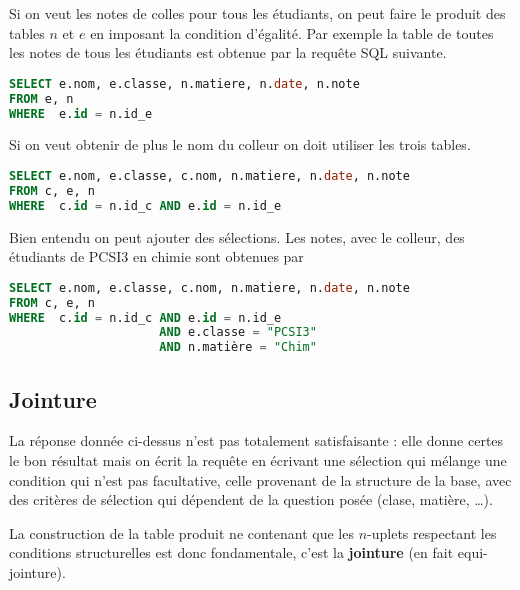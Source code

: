 Si on veut les notes de colles pour tous les étudiants, on peut faire le produit des tables $n$ et $e$ en imposant la condition d'égalité. Par exemple la table de toutes les notes de tous les étudiants est obtenue par la requête SQL suivante.
\begin{lstlisting}[language=SQL]
SELECT e.nom, e.classe, n.matiere, n.date, n.note
FROM e, n
WHERE  e.id = n.id_e
\end{lstlisting}
Si on veut obtenir de plus le nom du colleur on doit utiliser les trois tables.
\begin{lstlisting}[language=SQL]
SELECT e.nom, e.classe, c.nom, n.matiere, n.date, n.note
FROM c, e, n
WHERE  c.id = n.id_c AND e.id = n.id_e
\end{lstlisting}
Bien entendu on peut ajouter des sélections. Les notes, avec le colleur, des étudiants de PCSI3 en chimie sont obtenues par 
\begin{lstlisting}[language=SQL]
SELECT e.nom, e.classe, c.nom, n.matiere, n.date, n.note
FROM c, e, n
WHERE  c.id = n.id_c AND e.id = n.id_e
                     AND e.classe = "PCSI3"
                     AND n.matière = "Chim"
\end{lstlisting}

\subsection{Jointure}
La réponse donnée ci-dessus n'est pas totalement satisfaisante : elle donne certes le bon résultat mais on écrit la requête en écrivant une sélection qui mélange une condition qui n'est pas facultative, celle provenant de la structure de la base, avec des critères de sélection qui dépendent de la question posée (clase, matière, \dots). 


La construction de la table produit ne contenant que les $n$-uplets respectant les conditions structurelles est donc fondamentale, c'est la {\bf jointure} (en fait equi-jointure).

